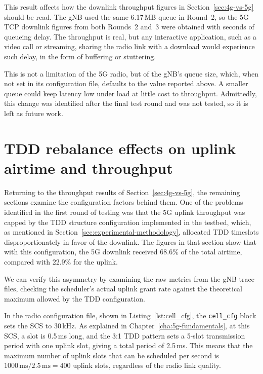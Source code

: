 This result affects how the downlink throughput figures in Section~\ref{sec:4g-vs-5g} should be read. The \gls{gNB} used the same 6.17\,MB queue in Round~2, so the 5G TCP downlink figures from both Rounds~2 and~3 were obtained with seconds of queueing delay. The throughput is real, but any interactive application, such as a video call or streaming, sharing the radio link with a download would experience such delay, in the form of buffering or stuttering.

This is not a limitation of the 5G radio, but of the \gls{gNB}'s queue size, which, when not set in its configuration file, defaults to the value reported above. A smaller queue could keep latency low under load at little cost to throughput. Admittedly, this change was identified after the final test round and was not tested, so it is left as future work.

\section{TDD rebalance effects on uplink airtime and throughput}
\label{sec:tdd-rebalance}

Returning to the throughput results of Section~\ref{sec:4g-vs-5g}, the remaining sections examine the configuration factors behind them. One of the problems identified in the first round of testing was that the 5G uplink throughput was capped by the \gls{TDD} structure configuration implemented in the testbed, which, as mentioned in Section~\ref{sec:experimental-methodology}, allocated \gls{TDD} timeslots disproportionately in favor of the downlink. The figures in that section show that with this configuration, the 5G downlink received 68.6\% of the total airtime, compared with 22.9\% for the uplink.

We can verify this asymmetry by examining the raw metrics from the \gls{gNB} trace files, checking the scheduler's actual uplink grant rate against the theoretical maximum allowed by the \gls{TDD} configuration.

In the radio configuration file, shown in Listing~\ref{lst:cell_cfg}, the \texttt{cell\_cfg} block sets the \gls{SCS} to 30\,kHz. As explained in Chapter~\ref{cha:5g-fundamentals}, at this \gls{SCS}, a slot is 0.5\,ms long, and the 3:1 \gls{TDD} pattern sets a 5-slot transmission period with one uplink slot, giving a total period of 2.5\,ms. This means that the maximum number of uplink slots that can be scheduled per second is $1000\,\text{ms} / 2.5\,\text{ms} = 400$ uplink slots, regardless of the radio link quality.

